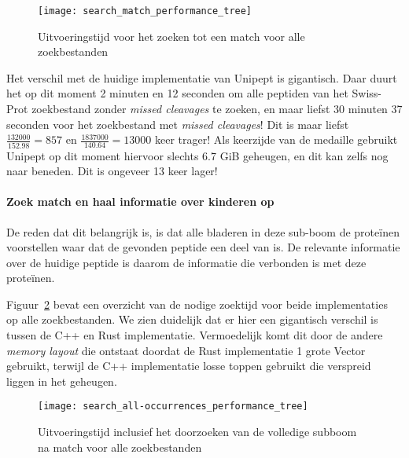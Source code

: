 \begin{figure}[H]
    \centering
    \texttt{[image: search\_match\_performance\_tree]}
    \caption{Uitvoeringstijd voor het zoeken tot een match voor alle zoekbestanden}
    \label{fig:performance_match_tree}
\end{figure}

Het verschil met de huidige implementatie van Unipept is gigantisch.
Daar duurt het op dit moment 2 minuten en 12 seconden om alle peptiden van het Swiss-Prot zoekbestand zonder \textit{missed cleavages} te zoeken,
en maar liefst 30 minuten 37 seconden voor het zoekbestand met \textit{missed cleavages}!
Dit is maar liefst $\frac{132 000}{152.98} = 857$ en $\frac{1 837 000}{140.64} = 13 000$ keer trager!
Als keerzijde van de medaille gebruikt Unipept op dit moment hiervoor slechts 6.7 GiB geheugen, en dit kan zelfs nog naar beneden.
Dit is ongeveer 13 keer lager!

\paragraph{Zoek match en haal informatie over kinderen op}
De reden dat dit belangrijk is, is dat alle bladeren in deze sub-boom de proteïnen voorstellen waar dat de gevonden peptide een deel van is.
De relevante informatie over de huidige peptide is daarom de informatie die verbonden is met deze proteïnen.

Figuur~\ref{fig:performance_all-occurrences_tree} bevat een overzicht van de nodige zoektijd voor beide implementaties op alle zoekbestanden.
We zien duidelijk dat er hier een gigantisch verschil is tussen de C++ en Rust implementatie.
Vermoedelijk komt dit door de andere \textit{memory layout} die ontstaat doordat de Rust implementatie 1 grote Vector gebruikt, terwijl de C++ implementatie losse toppen gebruikt die verspreid liggen in het geheugen.

\begin{figure}[H]
    \centering
    \texttt{[image: search\_all-occurrences\_performance\_tree]}
    \caption{Uitvoeringstijd inclusief het doorzoeken van de volledige subboom na match voor alle zoekbestanden}
    \label{fig:performance_all-occurrences_tree}
\end{figure}


